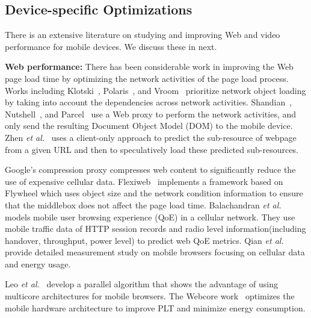 \subsection{Device-specific Optimizations}

There is an extensive literature on studying and improving Web and video performance for mobile devices. We discuss these in next. 

\noindent\textbf{Web performance:}
There has been considerable work in improving the Web page load time by optimizing the network activities of the page load process. Works including Klotski~\cite{butkiewicz2015klotski}, Polaris~\cite{netravali2016polaris}, and Vroom~\cite{ruamviboonsuk2017vroom} prioritize network object loading by taking into account the dependencies across network activities. 
Shandian~\cite{wang2016speeding}, Nutshell~\cite{sivakumar2017nutshell}, and Parcel~\cite{sivakumar2014parcel} use a Web proxy to perform the network activities, and only send the resulting Document Object Model (DOM) to the mobile device. Zhen \emph{et al.}~\cite{wang2012far} uses a client-only approach to predict the sub-resource of  webpage from a given URL and then to speculatively load these predicted sub-resources. 

Google's compression proxy \cite{agababov2015flywheel} compresses web content to significantly reduce the use of expensive cellular data.
Flexiweb~\cite{singh2015flexiweb} implements a framework based on Flywheel which uses object size and the network condition information to ensure that the middlebox does not affect the page load time. 
Balachandran \emph{et al.}~\cite{balachandran2014modeling} models mobile user browsing experience (QoE) in a cellular network. 
They use mobile traffic data of HTTP session records and radio level information(including handover, throughput, power level)  to predict web QoE metrics. %
Qian \emph{et al.}~\cite{qian2014characterizing} provide detailed measurement study on mobile browsers focusing on cellular data and energy usage. 

Leo \emph{et al.}~\cite{meyerovich2010fast} develop a parallel algorithm that shows the advantage of using multicore architectures for mobile browsers. The Webcore work~\cite{zhu2017optimizing} optimizes the mobile
hardware architecture to improve PLT and minimize energy consumption.

